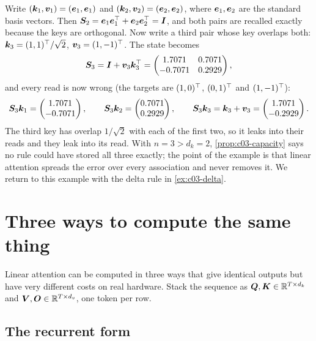 \begin{example}[Interference with $d_k=d_v=2$]\label{ex:c03-interference}
Write $(\bm{k}_1,\bm{v}_1)=(\bm{e}_1,\bm{e}_1)$ and $(\bm{k}_2,\bm{v}_2)=(\bm{e}_2,\bm{e}_2)$, where $\bm{e}_1,\bm{e}_2$ are
the standard basis vectors. Then $\bm{S}_2=\bm{e}_1\bm{e}_1^{\top}+\bm{e}_2\bm{e}_2^{\top}=\bm{I}$, and both pairs are
recalled exactly because the keys are orthogonal. Now write a third pair whose key overlaps both:
$\bm{k}_3=(1,1)^{\top}/\sqrt2$, $\bm{v}_3=(1,-1)^{\top}$. The state becomes
\[
  \bm{S}_3=\bm{I}+\bm{v}_3\bm{k}_3^{\top}=
  \begin{pmatrix}1.7071 & 0.7071\\ -0.7071 & 0.2929\end{pmatrix},
\]
and every read is now wrong (the targets are $(1,0)^{\top}$, $(0,1)^{\top}$ and $(1,-1)^{\top}$):
\[
  \bm{S}_3\bm{k}_1=\begin{pmatrix}1.7071\\-0.7071\end{pmatrix},\qquad
  \bm{S}_3\bm{k}_2=\begin{pmatrix}0.7071\\0.2929\end{pmatrix},\qquad
  \bm{S}_3\bm{k}_3=\bm{k}_3+\bm{v}_3=\begin{pmatrix}1.7071\\-0.2929\end{pmatrix}.
\]
The third key has overlap $1/\sqrt2$ with each of the first two, so it leaks into their reads
and they leak into its read. With $n=3>d_k=2$, \cref{prop:c03-capacity} says no rule could
have stored all three exactly; the point of the example is that linear attention spreads the
error over every association and never removes it. We return to this example with the delta
rule in \cref{ex:c03-delta}.
\end{example}

\section{Three ways to compute the same thing}\label{sec:c03-forms}

Linear attention can be computed in three ways that give identical outputs but have very
different costs on real hardware. Stack the sequence as $\bm{Q},\bm{K}\in\mathbb{R}^{T\times d_k}$ and
$\bm{V},\bm{O}\in\mathbb{R}^{T\times d_v}$, one token per row.

\subsection{The recurrent form}


